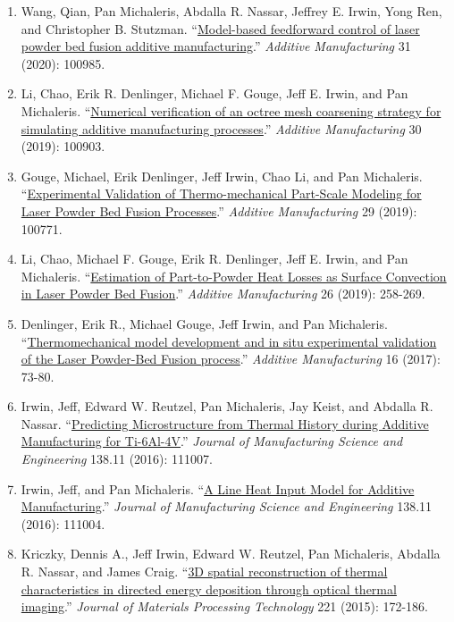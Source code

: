 \documentclass[10.5pt,letterpaper]{article}
\begin{document}
\spacedhrule{0.5em}{-0.5em}
\begin{enumerate}[leftmargin=*]
	\setlength{\parskip}{0em}
	\item Wang, Qian, Pan Michaleris, Abdalla R. Nassar, Jeffrey E. Irwin, Yong Ren, and Christopher B. Stutzman. ``\href{https://doi.org/10.1016/j.addma.2019.100985}{Model-based feedforward control of laser powder bed fusion additive manufacturing}.'' \emph{Additive Manufacturing} 31 (2020): 100985.
	\item Li, Chao, Erik R. Denlinger, Michael F. Gouge, Jeff E. Irwin, and Pan Michaleris. ``\href{https://doi.org/10.1016/j.addma.2019.100903}{Numerical verification of an octree mesh coarsening strategy for simulating additive manufacturing processes}.'' \emph{Additive Manufacturing} 30 (2019): 100903.
	\item Gouge, Michael, Erik Denlinger, Jeff Irwin, Chao Li, and Pan Michaleris. ``\href{https://doi.org/10.1016/j.addma.2019.06.022}{Experimental Validation of Thermo-mechanical Part-Scale Modeling for Laser Powder Bed Fusion Processes}.'' \emph{Additive Manufacturing} 29 (2019): 100771.
	\item Li, Chao, Michael F. Gouge, Erik R. Denlinger, Jeff E. Irwin, and Pan Michaleris. ``\href{https://doi.org/10.1016/j.addma.2019.02.006}{Estimation of Part-to-Powder Heat Losses as Surface Convection in Laser Powder Bed Fusion}.'' \emph{Additive Manufacturing} 26 (2019): 258-269.
	\item Denlinger, Erik R., Michael Gouge, Jeff Irwin, and Pan Michaleris. ``\href{https://www.sciencedirect.com/science/article/pii/S2214860417300441}{Thermomechanical model development and in situ experimental validation of the Laser Powder-Bed Fusion process}.'' \emph{Additive Manufacturing} 16 (2017): 73-80.
	\item Irwin, Jeff, Edward W. Reutzel, Pan Michaleris, Jay Keist, and Abdalla R. Nassar. ``\href{http://manufacturingscience.asmedigitalcollection.asme.org/article.aspx?articleid=2520839}{Predicting Microstructure from Thermal History during Additive Manufacturing for Ti-6Al-4V}.'' \emph{Journal of Manufacturing Science and Engineering} 138.11 (2016): 111007.
	\item Irwin, Jeff, and Pan Michaleris. ``\href{http://manufacturingscience.asmedigitalcollection.asme.org/article.aspx?articleid=2525324}{A Line Heat Input Model for Additive Manufacturing}.'' \emph{Journal of Manufacturing Science and Engineering} 138.11 (2016): 111004.
	\item Kriczky, Dennis A., Jeff Irwin, Edward W. Reutzel, Pan Michaleris, Abdalla R. Nassar, and James Craig. ``\href{https://www.sciencedirect.com/science/article/pii/S0924013615000643}{3D spatial reconstruction of thermal characteristics in directed energy deposition through optical thermal imaging}.'' \emph{Journal of Materials Processing Technology} 221 (2015): 172-186.

\end{enumerate}
\end{document}
